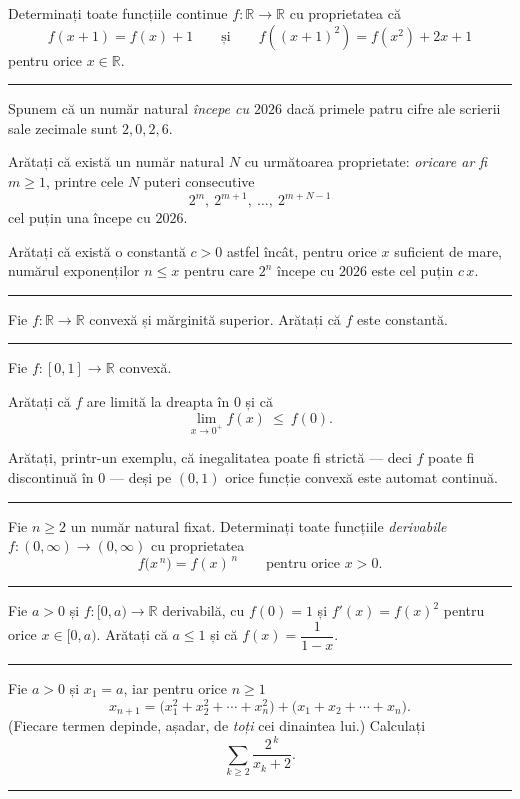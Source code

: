 Determinați toate funcțiile continue $f:\mathbb{R}\to\mathbb{R}$ cu proprietatea că
\[
f(x+1)=f(x)+1 \qquad \text{și} \qquad f\!\left((x+1)^2\right)=f(x^2)+2x+1
\]
pentru orice $x\in\mathbb{R}$.
\vspace{1mm}\hrule

Spunem că un număr natural \emph{începe cu $2026$} dacă primele patru cifre ale scrierii sale zecimale sunt $2,0,2,6$.
\begin{parti}
  \item Arătați că există un număr natural $N$ cu următoarea proprietate: \emph{oricare ar fi} $m\ge1$, printre cele $N$ puteri consecutive
  \[ 2^{m},\ 2^{m+1},\ \dots,\ 2^{m+N-1} \]
  cel puțin una începe cu $2026$.
  \item Arătați că există o constantă $c>0$ astfel încât, pentru orice $x$ suficient de mare, numărul exponenților $n\le x$ pentru care $2^{n}$ începe cu $2026$ este cel puțin $c\,x$.
\end{parti}
\vspace{1mm}\hrule

Fie $f:\mathbb{R}\to\mathbb{R}$ convexă și mărginită superior. Arătați că $f$ este constantă.
\vspace{1mm}\hrule

Fie $f:[0,1]\to\mathbb{R}$ convexă.
\begin{parti}
  \item Arătați că $f$ are limită la dreapta în $0$ și că
  \[ \lim_{x\to0^{+}}f(x)\ \le\ f(0) . \]
  \item Arătați, printr-un exemplu, că inegalitatea poate fi strictă --- deci $f$ poate fi discontinuă în $0$ --- deși pe $(0,1)$ orice funcție convexă este automat continuă.
\end{parti}
\vspace{1mm}\hrule

Fie $n\ge2$ un număr natural fixat. Determinați toate funcțiile \emph{derivabile} $f:(0,\infty)\to(0,\infty)$ cu proprietatea
\[ f\bigl(x^{\,n}\bigr)=f(x)^{\,n}\qquad\text{pentru orice }x>0 . \]
\vspace{1mm}\hrule

Fie $a>0$ și $f:[0,a)\to\mathbb{R}$ derivabilă, cu $f(0)=1$ și $f'(x)=f(x)^2$ pentru orice $x\in[0,a)$. Arătați că $a\le1$ și că $f(x)=\dfrac1{1-x}$.
\vspace{1mm}\hrule

Fie $a>0$ și $x_{1}=a$, iar pentru orice $n\ge1$
\[ x_{n+1}=\bigl(x_{1}^{2}+x_{2}^{2}+\cdots+x_{n}^{2}\bigr)+\bigl(x_{1}+x_{2}+\cdots+x_{n}\bigr) . \]
(Fiecare termen depinde, așadar, de \emph{toți} cei dinaintea lui.) Calculați
\[ \sum_{k\ge2}\frac{2^{\,k}}{x_{k}+2} . \]
\vspace{1mm}\hrule

